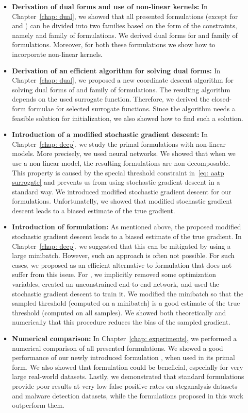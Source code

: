 \begin{itemize}
  \item \textbf{Derivation of dual forms and use of non-linear kernels:} In Chapter~\ref{chap: dual}, we showed that all presented formulations (except for \Grill and \GrillNP) can be divided into two families based on the form of the constraints, namely \TopPushK and \PatMat family of formulations. We derived dual forms for \TopPushK and \PatMat family of formulations. Moreover, for both these formulations we show how to incorporate non-linear kernels.
  \item \textbf{Derivation of an efficient algorithm for solving dual forms:} In Chapter~\ref{chap: dual}, we proposed a new coordinate descent algorithm for solving dual forms of \TopPushK and \PatMat family of formulations. The resulting algorithm depends on the used surrogate function. Therefore, we derived the closed-form formulae for selected surrogate functions. Since the algorithm needs a feasible solution for initialization, we also showed how to find such a solution.
  \item \textbf{Introduction of a modified stochastic gradient descent:} In Chapter~\ref{chap: deep}, we study the primal formulations with non-linear models. More precisely, we used neural networks. We showed that when we use a non-linear model, the resulting formulations are non-decomposable. This property is caused by the special threshold constraint in~\eqref{eq: aatp surrogate} and prevents us from using stochastic gradient descent in a standard way. We introduced modified stochastic gradient descent for our formulations. Unfortunatelly, we showed that modified stochastic gradient descent leads to a biased estimate of the true gradient.
  \item \textbf{Introduction of \DeepTopPush formulation:} As mentioned above, the proposed modified stochastic gradient descent leads to a biased estimate of the true gradient. In Chapter~\ref{chap: deep}, we suggested that this can be mitigated by using a large minibatch. However, such an approach is often not possible. For such cases, we proposed \DeepTopPush as an efficient alternative to \TopPush formulation that does not suffer from this issue. For \DeepTopPush, we implicitly removed some optimization variables, created an unconstrained end-to-end network, and used the stochastic gradient descent to train it. We modified the minibatch so that the sampled threshold (computed on a minibatch) is a good estimate of the true threshold (computed on all samples). We showed both theoretically and numerically that this procedure reduces the bias of the sampled gradient.
  \item \textbf{Numerical comparison:} In Chapter~\ref{chap: experiments}, we performed a numerical comparison of all presented formulations. We showed a good performance of our newly introduced formulation \PatMatNP, when used in its primal form. We also showed that \DeepTopPush formulation could be beneficial, especially for very large real-world datasets. Lastly, we demonstrated that standard formulations provide poor results at very low false-positive rates on steganalysis datasets and malware detection datasets, while the formulations proposed in this work outperform them.
\end{itemize}

